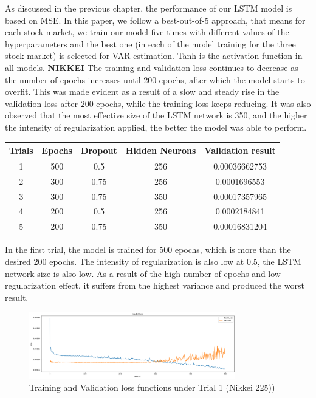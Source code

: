 \documentclass[a4paper,11pt,oneside]{book}
\begin{document}
As discussed in the previous chapter, the performance of our LSTM model is based on MSE. In this paper, we follow a best-out-of-5 approach, that means for each stock market, we train our model five times with different values of the hyperparameters and the best one (in each of the model training for the three stock market) is selected for VAR estimation. Tanh is the activation function in all models.\newline
\textbf{NIKKEI}\newline
The training and validation loss continues to decrease as the number of epochs increases until 200 epochs,
after which the model starts to overfit. This was made evident as a result of a slow and steady rise in the
validation loss after 200 epochs, while the training loss keeps reducing.
It was also observed that the most effective size of the LSTM network is 350, and the higher the intensity
of regularization applied, the better the model was able to perform.\newline

\begin{center}
	\begin{tabular}{||c c c c c||} 
		\hline
		Trials & Epochs & Dropout & Hidden Neurons & Validation result\\ [0.5ex] 
		\hline\hline
		1 & 500 & 0.5 & 256 & 0.00036662753 \\ 
		\hline
		2 & 300 & 0.75 & 256 & 0.0001696553 \\
		\hline
		3 & 300 & 0.75 & 350 & 0.00017357965 \\
		\hline
		4 & 200 & 0.5 & 256 & 0.0002184841 \\
		\hline
		5 & 200 & 0.75 & 350 & 0.00016831204\\ [1ex] 
		\hline
	\end{tabular}
\end{center}

In the first trial, the model is trained for 500 epochs, which is more than the desired 200 epochs. The intensity of
regularization is also low at 0.5, the LSTM network size is also low. As a result of the high number of
epochs and low regularization effect, it suffers from the highest variance and produced the worst result.\newline
\begin{figure}[!h]
	\centering
	\includegraphics[width=0.8\textwidth]{figures/Nik1}
	\caption{Training and Validation loss functions under Trial 1 (Nikkei 225))}
	\label{Nik1}
\end{figure}
\end{document}
